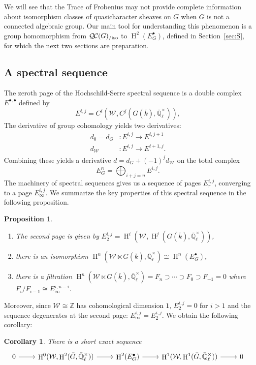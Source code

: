\documentclass{amsart}
\theoremstyle{plain}
\newtheorem{proposition}[theorem]{Proposition}
\newtheorem{corollary}[theorem]{Corollary}
\theoremstyle{definition}
\theoremstyle{remark}
\newcommand{\ZZ}{{\mathbb{Z}}}
\newcommand{\EE}{\mathbb{\bar Q}_\ell}
\newcommand{\bFq}{\bar{k}}
\newcommand{\EEx}{\EE^\times}
\newcommand{\Weil}[1]{\mathcal{W}_{#1}}
\DeclareMathOperator{\Hh}{H}
\newcommand{\QC}{{\mathcal{Q\hskip-0.8pt C}}}
\newcommand{\QCiso}[1]{\QC(#1)_{/\text{iso}}}
\begin{document}
We will see that the Trace of Frobenius may not provide complete
information about isomorphism classes of quasicharacter sheaves on $G$ when $G$ is not a connected algebraic group.
Our main tool for understanding this phenomenon
is a group homomorphism from $\QCiso{G}$ to $\Hh^2(E^\bullet_G)$, defined in Section~\ref{sec:S}, for which the next two sections are preparation.

\subsection{A spectral sequence}\label{sec:E}

The zeroth page of the Hochschild-Serre spectral sequence is a double complex $E^{\bullet, \bullet}$ defined by
\[
E^{i,j} = C^i(\Weil{}, C^j(G(\bFq), \EEx)),
\]
The derivative of group cohomology yields two derivatives:
\begin{align*}
d_0 = d_G &: E^{i,j} \to E^{i,j+1} \\
d_{\Weil{}} &: E^{i,j} \to E^{i+1,j}.
\end{align*}
Combining these yields a derivative $d = d_G + (-1)^j d_{\Weil{}}$ on the total complex
\[
E^n_G = \bigoplus_{i+j=n} E^{i,j}.
\]
The machinery of spectral sequences gives us a sequence of pages $E_r^{i,j}$, converging to a page $E_{\infty}^{i,j}$. We summarize the key properties of this spectral sequence in the following proposition.

\begin{proposition}
\begin{enumerate}
\item The second page is given by $E_2^{i,j} = \Hh^i(\Weil{}, \Hh^j(G(\bFq), \EEx))$,
\item there is an isomorphism $\Hh^n(\Weil{} \ltimes G(\bFq), \EEx) \cong \Hh^n(E_G^\bullet)$,
\item there is a filtration $\Hh^n(\Weil{} \ltimes G(\bFq), \EEx) = F_n \supset \cdots \supset F_0 \supset F_{-1} = 0$ where $F_i / F_{i-1} \cong E_{\infty}^{i, n-i}$.
\end{enumerate}
\end{proposition}

Moreover, since $\Weil{} \cong \ZZ$ has cohomological dimension $1$, $E_2^{i,j} = 0$ for $i > 1$ and the sequence degenerates at the second page: $E_{\infty}^{i,j} = E_2^{i,j}$. We obtain the following corollary:

\begin{corollary}
There is a short exact sequence
 \[
  \begin{tikzcd}
    0 \arrow{r}
    & \Hh^0(\Weil{},\Hh^2({\bar G},\EEx)) \arrow{r}
    & \Hh^2(E^\bullet_G) \arrow{r}
    & \Hh^1(\Weil{},\Hh^1({\bar G},\EEx)) \arrow{r}
    & 0
  \end{tikzcd}
 \]
\end{corollary}
\end{document}
